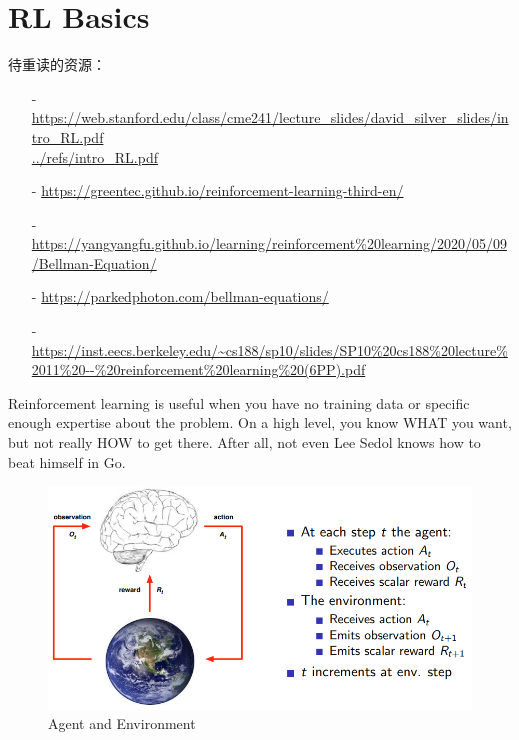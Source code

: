 
\chapter{RL Basics}\label{rl_basics}
待重读的资源：
\begin{itemize}
\setlength{\parskip}{0pt}
\item[-]
\url{https://web.stanford.edu/class/cme241/lecture_slides/david_silver_slides/intro_RL.pdf} \\
\url{../refs/intro_RL.pdf}

\item[-]
\url{https://greentec.github.io/reinforcement-learning-third-en/}

\item[-]
\url{https://yangyangfu.github.io/learning/reinforcement%20learning/2020/05/09/Bellman-Equation/}

\item[-]
\url{https://parkedphoton.com/bellman-equations/}

\item[-]
\url{https://inst.eecs.berkeley.edu/~cs188/sp10/slides/SP10%20cs188%20lecture%2011%20--%20reinforcement%20learning%20(6PP).pdf}

\end{itemize}


Reinforcement learning is useful when you have no training data or specific enough 
expertise about the problem. On a high level, you know WHAT you want, but not really 
HOW to get there. After all, not even Lee Sedol knows how to beat himself in Go.

\begin{figure}[H]
\centering
\includegraphics[scale=0.618]{pix/agent_n_env.png}
\caption{Agent and Environment}
\end{figure}


